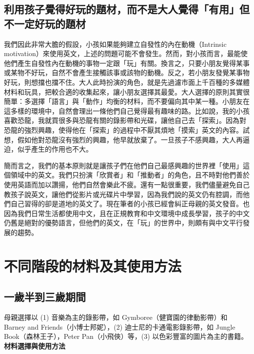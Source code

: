 \subsection{利用孩子覺得好玩的題材，而不是大人覺得「有用」但不一定好玩的題材}
我們因此非常大膽的假設，小孩如果能夠建立自發性的內在動機（Intrinsic motivation）來使用英文，上述的問題可能不會發生。然而，對小孩而言，最能使他們產生自發性內在動機的事物一定跟「玩」有關。換言之，只要小朋友覺得某事或某物不好玩，自然不會產生接觸該事或該物的動機。反之，若小朋友發覺某事物好玩，則想擋也擋不住。大人此時扮演的角色，就是先過濾市面上千百種的多媒體材料和玩具，把較合適的收集起來，讓小朋友選擇其最愛。大人選擇的原則其實很簡單：多選擇「語言」與「動作」均衡的材料，而不要偏向其中某一種。小朋友在這多樣的環境中，自然會理出一條他們自己覺得最有趣味的路。比如說，我的小孩喜歡恐龍，我就買很多與恐龍有關的錄影帶和光碟，讓他自己去「探索」。因為對恐龍的強烈興趣，使得他在「探索」的過程中不厭其煩地「摸索」英文的內容。試想，假如他對恐龍沒有強烈的興趣，他早就放棄了。一旦孩子不感興趣，大人再逼迫，似乎產生的作用也不大。

簡而言之，我們的基本原則就是讓孩子們在他們自己最感興趣的世界裡「使用」這個領域中的英文。我們只扮演「欣賞者」和「推動者」的角色，且不時對他們善於使用英語而加以讚揚，他們自然會樂此不疲。還有一點很重要，我們儘量避免自己教孩子說英文，讓他們從影片或光碟片中學習，因為我們說的英文仍有腔調，而他們自己習得的卻是道地的英文了。現在筆者的小孩已經會糾正母親的英文發音。也因為我們日常生活都使用中文，且在正規教育和中文環境中成長學習，孩子的中文仍舊是絕對的優勢語言，但他們的英文，在「玩」的世界中，則頗有與中文平行發展的趨勢。

\section{不同階段的材料及其使用方法}
\subsection{一歲半到三歲期間}
母親選擇以 (1) 音樂為主的錄影帶，如 Gymboree（健寶園的律動影帶）和 Barney and Friends（小博士邦妮），(2) 迪士尼的卡通電影錄影帶，如 Jungle Book（森林王子），Peter Pan（小飛俠）等，(3) 以色彩豐富的圖片為主的書籍。\\

\textbf{材料選擇與使用方法} %

